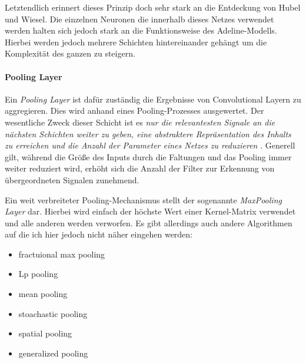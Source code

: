 Letztendlich erinnert dieses Prinzip doch sehr stark an die Entdeckung von Hubel und Wiesel. Die einzelnen Neuronen die innerhalb dieses Netzes verwendet werden halten sich jedoch stark an die Funktionsweise des Adeline-Modells. Hierbei werden jedoch mehrere Schichten hintereinander gehängt um die Komplexität des ganzen zu steigern. 

\paragraph{Pooling Layer}
Ein \emph{Pooling Layer} ist dafür zuständig die Ergebnisse von Convolutional Layern zu aggregieren. Dies wird anhand eines Pooling-Prozesses ausgewertet. Der wesentliche Zweck dieser Schicht ist es \emph{nur die relevantesten Signale an die nächsten Schichten weiter zu geben, eine abstraktere Repräsentation des Inhalts zu erreichen und die Anzahl der Parameter eines Netzes zu reduzieren} \cite{cnnFunktionsweise2}. Generell gilt, während die Größe des Inputs durch die Faltungen und das Pooling immer weiter reduziert wird, erhöht sich die Anzahl der Filter zur Erkennung von übergeordneten Signalen zunehmend.

Ein weit verbreiteter Pooling-Mechanismus stellt der sogenannte \emph{MaxPooling Layer} dar. Hierbei wird einfach der höchste Wert einer Kernel-Matrix verwendet und alle anderen werden verworfen. Es gibt allerdings auch andere Algorithmen auf die ich hier jedoch nicht näher eingehen werden: 

\begin{multicols}{2}
\begin{itemize}
\item fractuional max pooling
\item Lp pooling
\item mean pooling
\item stoachastic pooling
\item spatial pooling
\item generalized pooling
\end{itemize}
\end{multicols}


